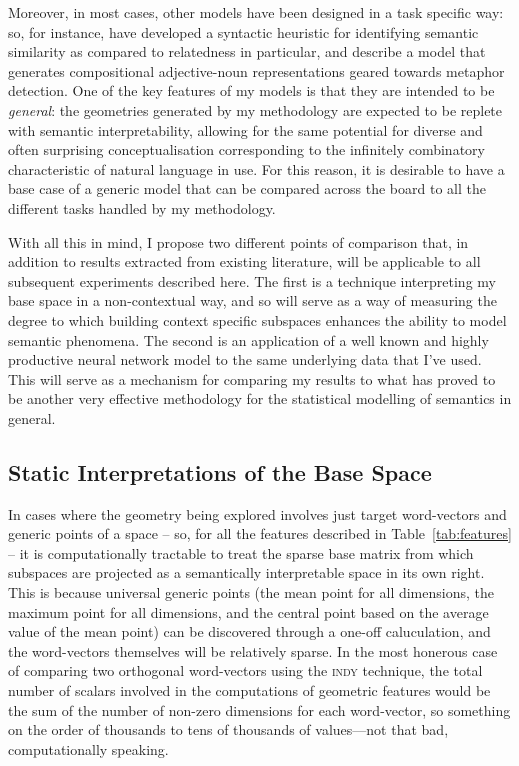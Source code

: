 Moreover, in most cases, other models have been designed in a task specific way: so, for instance, \cite{SchwartzEA2015} have developed a syntactic heuristic for identifying semantic similarity as compared to relatedness in particular, and \cite{GutierrezEA2016} describe a model that generates compositional adjective-noun representations geared towards metaphor detection.  One of the key features of my models is that they are intended to be \emph{general}: the geometries generated by my methodology are expected to be replete with semantic interpretability, allowing for the same potential for diverse and often surprising conceptualisation corresponding to the infinitely combinatory characteristic of natural language in use.  For this reason, it is desirable to have a base case of a generic model that can be compared across the board to all the different tasks handled by my methodology.

With all this in mind, I propose two different points of comparison that, in addition to results extracted from existing literature, will be applicable to all subsequent experiments described here.  The first is a technique interpreting my base space in a non-contextual way, and so will serve as a way of measuring the degree to which building context specific subspaces enhances the ability to model semantic phenomena.  The second is an application of a well known and highly productive neural network model to the same underlying data that I've used.  This will serve as a mechanism for comparing my results to what has proved to be another very effective methodology for the statistical modelling of semantics in general.

\subsection{Static Interpretations of the Base Space}
In cases where the geometry being explored involves just target word-vectors and generic points of a space -- so, for all the features described in Table~\ref{tab:features} -- it is computationally tractable to treat the sparse base matrix from which subspaces are projected as a semantically interpretable space in its own right.  This is because universal generic points (the mean point for all dimensions, the maximum point for all dimensions, and the central point based on the average value of the mean point) can be discovered through a one-off caluculation, and the word-vectors themselves will be relatively sparse.  In the most honerous case of comparing two orthogonal word-vectors using the \textsc{indy} technique, the total number of scalars involved in the computations of geometric features would be the sum of the number of non-zero dimensions for each word-vector, so something on the order of thousands to tens of thousands of values---not that bad, computationally speaking.

